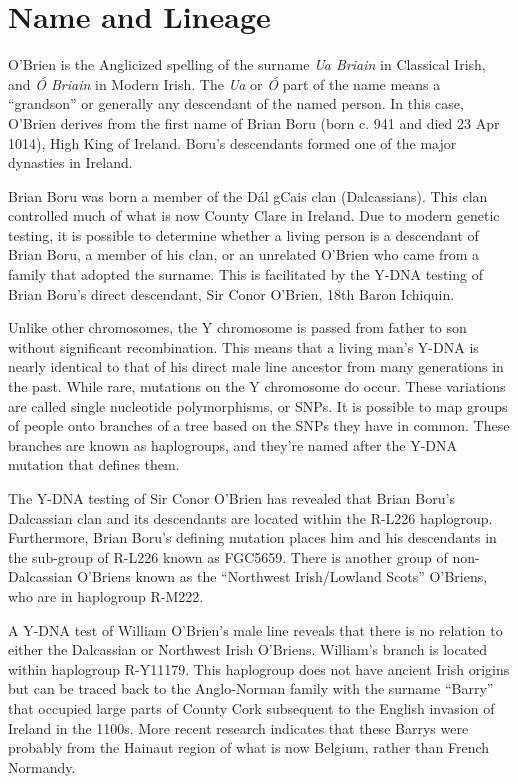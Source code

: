 \section{Name and Lineage}

O'Brien is the Anglicized spelling of the surname \textit{Ua Briain} in Classical Irish, and \textit{\'{O} Briain} in Modern Irish. The \textit{Ua} or \textit{\'{O}} part of the name means a ``grandson'' or generally any descendant of the named person. In this case, O'Brien derives from the first name of Brian Boru (born c. 941 and died 23 Apr 1014), High King of Ireland. Boru's descendants formed one of the major dynasties in Ireland.\cite{BoruHistorical}

Brian Boru was born a member of the D\'{a}l gCais clan (Dalcassians). This clan controlled much of what is now County Clare in Ireland.\cite{BoruEarlyHistory} Due to modern genetic testing, it is possible to determine whether a living person is a descendant of Brian Boru, a member of his clan, or an unrelated O'Brien who came from a family that adopted the surname. This is facilitated by the Y-DNA testing of Brian Boru's direct descendant, Sir Conor O'Brien, 18th Baron Ichiquin.\cite{GGI}

Unlike other chromosomes, the Y chromosome is passed from father to son without significant recombination. This means that a living man's Y-DNA is nearly identical to that of his direct male line ancestor from many generations in the past. While rare, mutations on the Y chromosome do occur. These variations are called single nucleotide polymorphisms, or SNPs. It is possible to map groups of people onto branches of a tree based on the SNPs they have in common. These branches are known as haplogroups, and they're named after the Y-DNA mutation that defines them.\cite{Bettinger}

The Y-DNA testing of Sir Conor O'Brien has revealed that Brian Boru's Dalcassian clan and its descendants are located within the R-L226 haplogroup. Furthermore, Brian Boru's defining mutation places him and his descendants in the sub-group of R-L226 known as FGC5659. There is another group of non-Dalcassian O'Briens known as the ``Northwest Irish/Lowland Scots'' O'Briens, who are in haplogroup R-M222.\cite{GGI}

A Y-DNA test of William O'Brien's male line\cite{BigY} reveals that there is no relation to either the Dalcassian or Northwest Irish O'Briens. William's branch is located within haplogroup R-Y11179. This haplogroup does not have ancient Irish origins but can be traced back to the Anglo-Norman family with the surname ``Barry'' that occupied large parts of County Cork subsequent to the English invasion of Ireland in the 1100s.\cite{BarrymoreDNA2} More recent research indicates that these Barrys were probably from the Hainaut region of what is now Belgium, rather than French Normandy.\cite{BarrymoreDNA}

